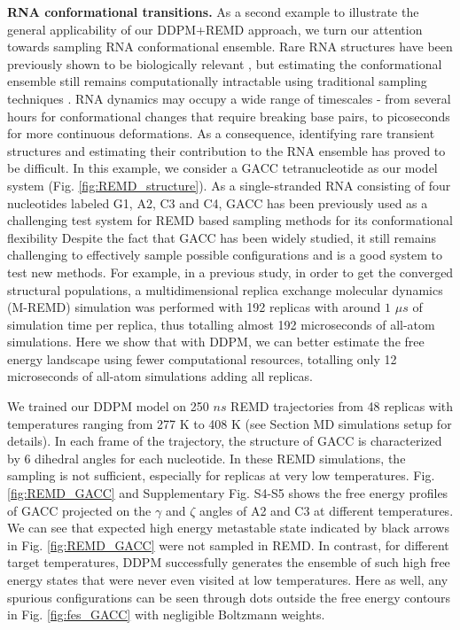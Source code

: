 \documentclass[9pt,twocolumn,twoside]{pnas-new}
\begin{document}
\textbf{RNA conformational transitions.}
As a second example to illustrate the general applicability of our DDPM+REMD approach, we turn our attention towards sampling RNA conformational ensemble. Rare RNA structures have been previously shown to be biologically relevant \cite{Bannwarth2005, SchulzeGahmen2018, Ganser2019}, but estimating the conformational ensemble still remains computationally intractable using traditional sampling techniques \cite{Sponer2018}. RNA dynamics may occupy a wide range of timescales - from several hours for conformational changes that require breaking base pairs, to picoseconds for more continuous deformations. \cite{Ganser2019} As a consequence, identifying rare transient structures and estimating their contribution to the RNA ensemble has proved to be difficult.
In this example, we consider a GACC tetranucleotide as our model system (Fig. \ref{fig:REMD_structure}). As a single-stranded RNA consisting of four nucleotides labeled G1, A2, C3 and C4, GACC has been previously used as a challenging test system for REMD based sampling methods for its conformational flexibility \cite{long_REMD_GACC}
Despite the fact that GACC has been widely studied, it still remains challenging to effectively sample possible configurations and is a good system to test new methods\cite{Sponer2018}. For example, in a previous study, in order to get the converged structural populations, a multidimensional replica exchange molecular dynamics (M-REMD) simulation was performed with 192 replicas with around $1$ $\mu s$ of simulation time per replica, thus totalling almost 192 microseconds of all-atom simulations.\cite{long_REMD_GACC} Here we show that with DDPM, we can better estimate the free energy landscape using fewer computational resources, totalling only 12 microseconds of all-atom simulations adding all replicas.

We trained our DDPM model on 250 $ns$ REMD trajectories from 48 replicas with temperatures ranging from 277 K to 408 K (see Section MD simulations setup for details). In each frame of the trajectory, the structure of GACC is characterized by 6 dihedral angles for each nucleotide. In these REMD simulations, the sampling is not sufficient, especially for replicas at very low temperatures. Fig. \ref{fig:REMD_GACC} and Supplementary Fig. S4-S5 shows the free energy profiles of GACC projected on the $\gamma$ and $\zeta$ angles of A2 and C3 at different temperatures. We can see that expected high energy metastable state indicated by black arrows in Fig. \ref{fig:REMD_GACC} were not sampled in REMD. In contrast, for different target temperatures, DDPM successfully generates the ensemble of such high free energy states that were never even visited at low temperatures. Here as well, any spurious configurations can be seen through dots outside the free energy contours in Fig. \ref{fig:fes_GACC} with negligible Boltzmann weights.
\end{document}
